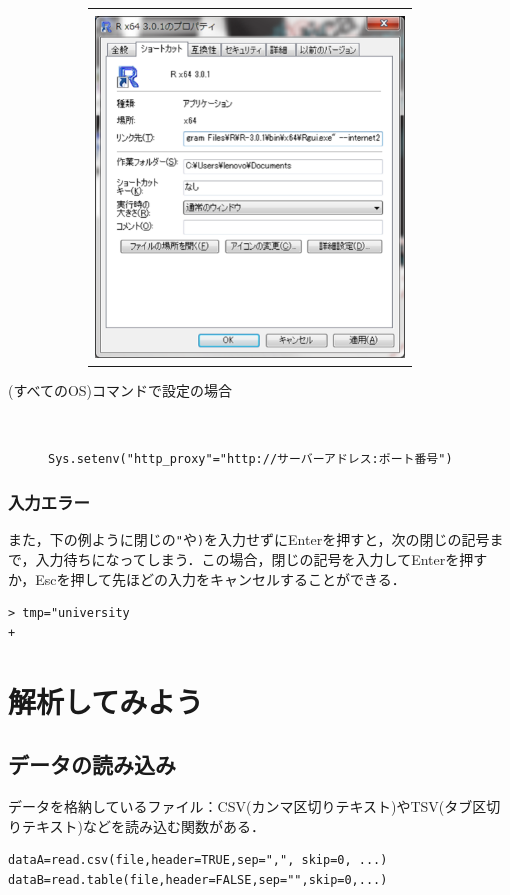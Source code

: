 \documentclass[a4paper,10pt,fleqn]{jarticle}
\begin{document}
\begin{description}
\begin{figure}[H]
\begin{center}
\begin{tabular}{c}
\begin{minipage}{0.65\hsize}
          にする．\\
          \includegraphics[width=8.2cm]{img/property.eps}
      \end{minipage}
    \end{tabular}
  \end{center}
\end{figure}
\item[(すべてのOS)コマンドで設定の場合]\mbox{}\\
\begin{screen}
\begin{verbatim}
Sys.setenv("http_proxy"="http://サーバーアドレス:ポート番号")
\end{verbatim}
\end{screen}
\end{description}
\subsubsection{入力エラー}
また，下の例ように閉じの\verb+"+や\verb+)+を入力せずにEnterを押すと，次の閉じの記号まで，入力待ちになってしまう．この場合，閉じの記号を入力してEnterを押すか，Escを押して先ほどの入力をキャンセルすることができる．
\begin{breakbox}
\begin{verbatim}
> tmp="university
+ 
\end{verbatim}
\end{breakbox}
\newpage
\section{解析してみよう}
\subsection{データの読み込み}
データを格納しているファイル：CSV(カンマ区切りテキスト)やTSV(タブ区切りテキスト)などを読み込む関数がある．
\begin{screen}
\begin{verbatim}
dataA=read.csv(file,header=TRUE,sep=",", skip=0, ...) 
dataB=read.table(file,header=FALSE,sep="",skip=0,...) 
\end{verbatim}
\end{screen}
\end{document}
